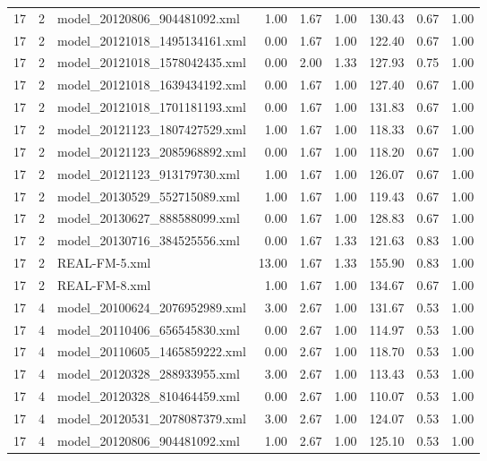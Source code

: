 \begin{table}[ht]
\begin{tabular}{rrlrrrrrr}
   17 &   2 & model\_20120806\_904481092.xml & 1.00 & 1.67 & 1.00 & 130.43 & 0.67 & 1.00 \\ 
   17 &   2 & model\_20121018\_1495134161.xml & 0.00 & 1.67 & 1.00 & 122.40 & 0.67 & 1.00 \\ 
   17 &   2 & model\_20121018\_1578042435.xml & 0.00 & 2.00 & 1.33 & 127.93 & 0.75 & 1.00 \\ 
   17 &   2 & model\_20121018\_1639434192.xml & 0.00 & 1.67 & 1.00 & 127.40 & 0.67 & 1.00 \\ 
   17 &   2 & model\_20121018\_1701181193.xml & 0.00 & 1.67 & 1.00 & 131.83 & 0.67 & 1.00 \\ 
   17 &   2 & model\_20121123\_1807427529.xml & 1.00 & 1.67 & 1.00 & 118.33 & 0.67 & 1.00 \\ 
   17 &   2 & model\_20121123\_2085968892.xml & 0.00 & 1.67 & 1.00 & 118.20 & 0.67 & 1.00 \\ 
   17 &   2 & model\_20121123\_913179730.xml & 1.00 & 1.67 & 1.00 & 126.07 & 0.67 & 1.00 \\ 
   17 &   2 & model\_20130529\_552715089.xml & 1.00 & 1.67 & 1.00 & 119.43 & 0.67 & 1.00 \\ 
   17 &   2 & model\_20130627\_888588099.xml & 0.00 & 1.67 & 1.00 & 128.83 & 0.67 & 1.00 \\ 
   17 &   2 & model\_20130716\_384525556.xml & 0.00 & 1.67 & 1.33 & 121.63 & 0.83 & 1.00 \\ 
   17 &   2 & REAL-FM-5.xml & 13.00 & 1.67 & 1.33 & 155.90 & 0.83 & 1.00 \\ 
   17 &   2 & REAL-FM-8.xml & 1.00 & 1.67 & 1.00 & 134.67 & 0.67 & 1.00 \\ 
   17 &   4 & model\_20100624\_2076952989.xml & 3.00 & 2.67 & 1.00 & 131.67 & 0.53 & 1.00 \\ 
   17 &   4 & model\_20110406\_656545830.xml & 0.00 & 2.67 & 1.00 & 114.97 & 0.53 & 1.00 \\ 
   17 &   4 & model\_20110605\_1465859222.xml & 0.00 & 2.67 & 1.00 & 118.70 & 0.53 & 1.00 \\ 
   17 &   4 & model\_20120328\_288933955.xml & 3.00 & 2.67 & 1.00 & 113.43 & 0.53 & 1.00 \\ 
   17 &   4 & model\_20120328\_810464459.xml & 0.00 & 2.67 & 1.00 & 110.07 & 0.53 & 1.00 \\ 
   17 &   4 & model\_20120531\_2078087379.xml & 3.00 & 2.67 & 1.00 & 124.07 & 0.53 & 1.00 \\ 
   17 &   4 & model\_20120806\_904481092.xml & 1.00 & 2.67 & 1.00 & 125.10 & 0.53 & 1.00 \\ 

\end{tabular}
\end{table}
